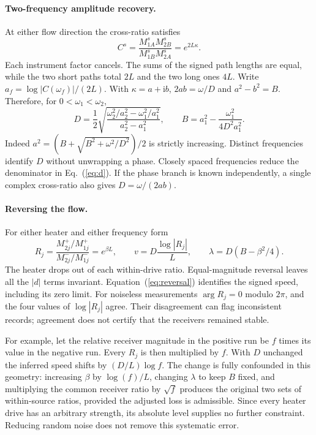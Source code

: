 \documentclass[11pt]{article}
\newcommand{\ii}{\mathrm i}
\begin{document}
\paragraph{Two-frequency amplitude recovery.}
At either flow direction the cross-ratio satisfies
\begin{equation}
 C^s=\frac{M^s_{1A}M^s_{2B}}{M^s_{1B}M^s_{2A}}=e^{2L\kappa}.
 \label{eq:cross}
\end{equation}
Each instrument factor cancels. The sums of the signed path lengths are equal, while the two short paths total $2L$ and the two long ones $4L$. Write $a_f=\log|C(\omega_f)|/(2L)$. With $\kappa=a+\ii b$, $2ab=\omega/D$ and $a^2-b^2=B$. Therefore, for $0<\omega_1<\omega_2$,
\begin{equation}
 D=\frac12\sqrt{\frac{\omega_2^2/a_2^2-\omega_1^2/a_1^2}{a_2^2-a_1^2}},
 \qquad B=a_1^2-\frac{\omega_1^2}{4D^2a_1^2}.
 \label{eq:d}
\end{equation}
Indeed $a^2=(B+\sqrt{B^2+\omega^2/D^2})/2$ is strictly increasing. Distinct frequencies identify $D$ without unwrapping a phase. Closely spaced frequencies reduce the denominator in Eq.~(\ref{eq:d}). If the phase branch is known independently, a single complex cross-ratio also gives $D=\omega/(2ab)$.

\paragraph{Reversing the flow.}
For either heater and either frequency form
\begin{equation}
 R_j=\frac{M^+_{2j}/M^+_{1j}}{M^-_{2j}/M^-_{1j}}=e^{\beta L},
 \qquad v=D\frac{\log|R_j|}{L},\qquad
 \lambda=D(B-\beta^2/4).
 \label{eq:reversal}
\end{equation}
The heater drops out of each within-drive ratio. Equal-magnitude reversal leaves all the $|d|$ terms invariant. Equation~(\ref{eq:reversal}) identifies the signed speed, including its zero limit. For noiseless measurements $\arg R_j=0$ modulo $2\pi$, and the four values of $\log|R_j|$ agree. Their disagreement can flag inconsistent records; agreement does not certify that the receivers remained stable.

For example, let the relative receiver magnitude in the positive run be $f$ times its value in the negative run. Every $R_j$ is then multiplied by $f$. With $D$ unchanged the inferred speed shifts by $(D/L)\log f$. The change is fully confounded in this geometry: increasing $\beta$ by $\log(f)/L$, changing $\lambda$ to keep $B$ fixed, and multiplying the common receiver ratio by $\sqrt f$ produces the original two sets of within-source ratios, provided the adjusted loss is admissible. Since every heater drive has an arbitrary strength, its absolute level supplies no further constraint. Reducing random noise does not remove this systematic error.
\end{document}
